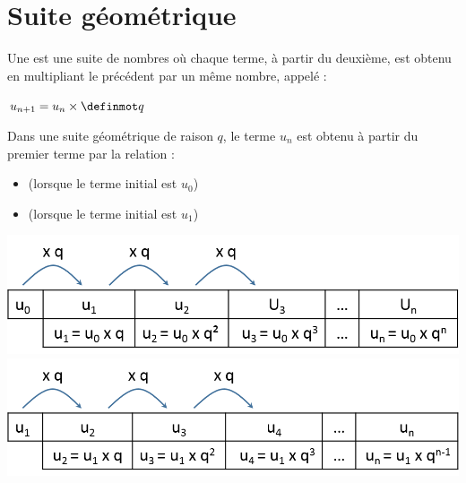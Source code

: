 \documentclass[12pt,a4paper]{article}
\begin{document}
\section{Suite géométrique}


\begin{mydef}
	Une  est une suite de nombres où chaque terme, à partir du deuxième, est obtenu en multipliant le précédent par un même nombre, appelé  :
	
	\begin{center}
		$u_{n+1}=u_n \times \kw{q}$
	\end{center} 
\end{mydef}

\begin{myprop}
	Dans une suite géométrique de raison $q$, le terme $u_n$ est obtenu à partir du premier terme par la relation :
	\begin{itemize}
		\item {} (lorsque le terme initial est $u_0$) 
		\item {} (lorsque le terme initial est $u_1$)
	\end{itemize}
	
	\begin{multicols}{2}
		\includegraphics[scale=0.45]{./img/geo1}
		\includegraphics[scale=0.45]{./img/geo2}
	\end{multicols}
\end{myprop}



\end{document}
